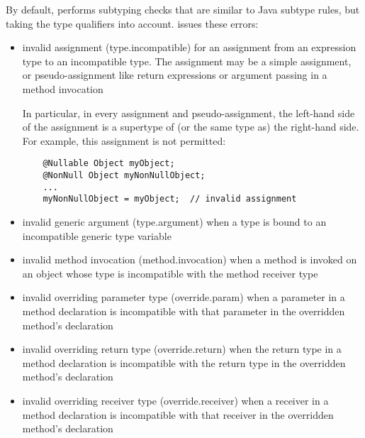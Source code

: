 By default,  performs subtyping checks that are
similar to Java subtype rules, but taking the type qualifiers into account.
 issues these errors:

\begin{itemize}

\item invalid assignment (type.incompatible) for an assignment from
  an expression type to an incompatible type.  The assignment may be a
  simple assignment, or pseudo-assignment like return expressions or
  argument passing in a method invocation

  In particular, in every assignment and pseudo-assignment, the
  left-hand side of the assignment is a supertype of (or the same type
  as) the right-hand side.  For example, this assignment is not
  permitted:

  \begin{Verbatim}
    @Nullable Object myObject;
    @NonNull Object myNonNullObject;
    ...
    myNonNullObject = myObject;  // invalid assignment
  \end{Verbatim}

\item invalid generic argument (type.argument) when a type
  is bound to an incompatible generic type variable

\item invalid method invocation (method.invocation) when a
  method is invoked on an object whose type is incompatible with the
  method receiver type

\item invalid overriding parameter type (override.param)
  when a parameter in a method declaration is incompatible with that
  parameter in the overridden method's declaration

\item invalid overriding return type (override.return) when the
  return type in a method declaration is incompatible with the
  return type in the overridden method's declaration

\item invalid overriding receiver type (override.receiver)
  when a receiver in a method declaration is incompatible with that
  receiver in the overridden method's declaration

\end{itemize}



